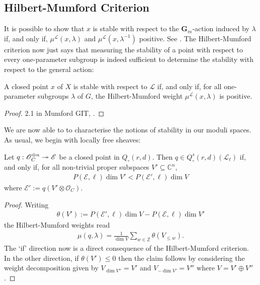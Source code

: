 \documentclass[12pt]{ociamthesis}  %
\begin{document}
\begin{example}
  \missingexample
\end{example}

\subsection{Hilbert-Mumford Criterion}

It is possible to show that $x$ is stable with
respect to the $\mathbf G_m$-action induced by $\lambda$ if, and only
if, $\mu^{\mathscr L}(x,\lambda)$ and $\mu^{\mathscr L}(x,\lambda^{-1})$
positive.
See \cite[Lemma 6.9]{hoskins2016}.
The Hilbert-Mumford criterion now just says that measuring the
stability of a point with respect to every one-parameter subgroup
is indeed sufficient to determine the stability with respect to the
general action:

\begin{theorem}
  A closed point $x$ of $X$ is stable with
  respect to $\mathscr L$ if, and only if, for all one-parameter
  subgroups $\lambda$ of $G$, the Hilbert-Mumford weight
  $\mu^{\mathscr L}(x,\lambda)$ is positive.
  \begin{proof}
    2.1 in Mumford GIT, \cite[Theorem 4.9]{newstead1978}.
    \missingproof
  \end{proof}
\end{theorem}

We are now able to to characterise the notions of stability
in our moduli spaces. As usual, we begin with locally free sheaves:

\begin{example}
  Let $q : \mathscr O^{\oplus n}_C \twoheadrightarrow \mathscr E$ be a closed point
  in $Q_\circ(r,d)$. Then $q\in Q^{s}_\circ(r,d)(\mathscr L_\ell)$
  if, and only if, for all non-trivial proper subspaces
  $V'\subseteq \mathbb C^n$,
  \begin{align}\label{eq:git_stable_sheaf}
    P(\mathscr E,\ell)\dim V'< P(\mathscr E',\ell)\dim V
  \end{align}
  where $\mathscr E' := q(V'\otimes\mathscr O_C)$.
  \begin{proof}
    Writing
    \begin{align*}
      \theta(V') := P(\mathscr E',\ell)\dim V-P(\mathscr E,\ell)\dim V'
    \end{align*}
    the Hilbert-Mumford weights read
    \begin{align*}
      \mu(q,\lambda) = \frac{1}{\dim V}\sum_{w\in\mathbb Z} \theta(V_{\leq w}).
    \end{align*}
    The `if' direction now is a direct consequence of the Hilbert-Mumford
    criterion. In the other direction, if $\theta(V')\leq 0$ then the
    claim follows by considering the weight decomposition given by
    $V_{\dim V''} = V'$ and $V_{-\dim V'} = V''$
    where $V = V' \oplus V''$.
  \end{proof}
\end{example}
\end{document}
